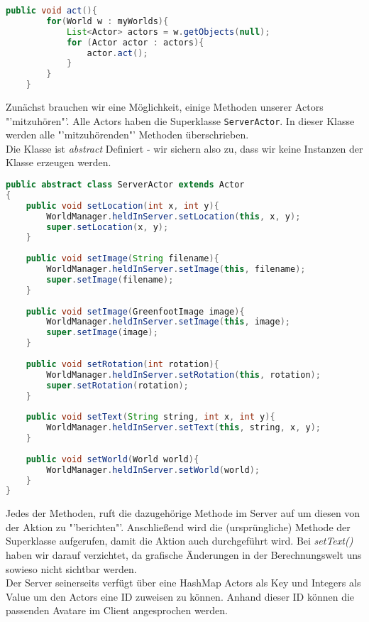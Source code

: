 \documentclass{pi1}
\begin{document}
\begin{lstlisting}[caption={}, firstnumber=135, language=Java]
public void act(){
        for(World w : myWorlds){
            List<Actor> actors = w.getObjects(null);
            for (Actor actor : actors){
                actor.act();
            }
        }
    }
\end{lstlisting}

Zunächst brauchen wir eine Möglichkeit, einige Methoden unserer Actors "'mitzuhören"'. Alle Actors haben die Superklasse \texttt{ServerActor}. In dieser Klasse werden alle "'mitzuhörenden"' Methoden überschrieben. \\
Die Klasse ist \emph{abstract} Definiert - wir sichern also zu, dass wir keine Instanzen der Klasse erzeugen werden.

\begin{lstlisting}[caption={}, firstnumber=12, language=Java]
public abstract class ServerActor extends Actor
{
    public void setLocation(int x, int y){
        WorldManager.heldInServer.setLocation(this, x, y);
        super.setLocation(x, y);
    }
    
    public void setImage(String filename){
        WorldManager.heldInServer.setImage(this, filename);
        super.setImage(filename);
    }
    
    public void setImage(GreenfootImage image){
        WorldManager.heldInServer.setImage(this, image);
        super.setImage(image);
    }
    
    public void setRotation(int rotation){
        WorldManager.heldInServer.setRotation(this, rotation);
        super.setRotation(rotation);
    }
    
    public void setText(String string, int x, int y){
        WorldManager.heldInServer.setText(this, string, x, y);
    }
    
    public void setWorld(World world){
        WorldManager.heldInServer.setWorld(world);
    }
}

\end{lstlisting}
Jedes der Methoden, ruft die dazugehörige Methode im Server auf um diesen von der Aktion zu "'berichten"'. Anschließend wird die (ursprüngliche) Methode der Superklasse aufgerufen, damit die Aktion auch durchgeführt wird. Bei \emph{setText()} haben wir darauf verzichtet, da grafische Änderungen in der Berechnungswelt uns sowieso nicht sichtbar werden.
\\
Der Server seinerseits verfügt über eine HashMap Actors als Key und Integers als Value um den Actors eine ID zuweisen zu können. Anhand dieser ID können die passenden Avatare im Client angesprochen werden.
\end{document}
